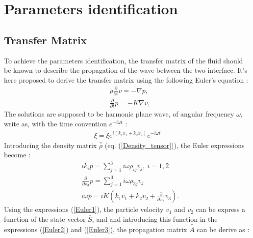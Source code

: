 \documentclass{article}
\begin{document}
\section{Parameters identification}
\subsection{Transfer Matrix}
    To achieve the parameters identification, the transfer matrix of the fluid should be known to describe the propagation of the wave between the two interface. It's here proposed to derive the transfer matrix using the following Euler's equation :
    \begin{align}
        &\rho \frac{\partial}{\partial t}v=-\nabla p, \\
	    &\frac{\partial}{\partial t}p=-K\nabla v,
    \end{align}
    The solutions are supposed to be harmonic plane wave, of angular frequency $\omega$, write as, with the time convention $e^{-i\omega t}$ :
    \begin{align}
        \xi=\tilde{\xi}e^{i(k_1 x_1+k_2 x_2)}e^{-i\omega t}
    \end{align}
    Introducing the density matrix $\bar{\bar{\rho}}$ (eq. (\ref{Density_tensor})), the Euler expressions become :
    \begin{align}
	    &ik_ip=\sum_{j=1}^{3} i \omega \rho_{ij} v_j,\ i=1,2\label{Euler1}\\
	    &\frac{\partial}{\partial x_3}p=\sum_{j=1}^{3} i \omega \rho_{3j} v_j\label{Euler2}\\
        &i\omega p= iK(k_1v_1+k_2v_2+\frac{\partial}{\partial x_3}v_3).\label{Euler3}
    \end{align}
    Using the expressions (\ref{Euler1}), the particle velocity $v_1$ and $v_2$ can be express a function of the state vector $\bar{S}$, and and introducing this function in the expressions (\ref{Euler2}) and (\ref{Euler3}), the propagation matrix $\bar{\bar{A}}$ can be derive as :
\end{document}
